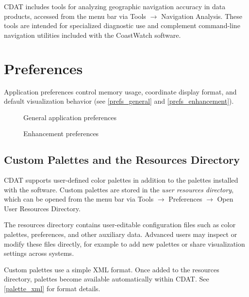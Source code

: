 CDAT includes tools for analyzing geographic navigation accuracy in
data products, accessed from the menu bar via {\gui Tools \(\rightarrow\) Navigation Analysis}. 
These tools are intended for specialized diagnostic use
and complement command-line navigation utilities included with the
CoastWatch software.

\section{Preferences}
\label{preferences}

Application preferences control memory usage, coordinate display format,
and default visualization behavior (see \autoref{prefs_general} and 
\autoref{prefs_enhancement}).

\begin{figure}
  \begin{center}
    \caption{General application preferences}
    \label{prefs_general}
  \end{center}
\end{figure}

\begin{figure}
  \begin{center}
    \caption{Enhancement preferences}
    \label{prefs_enhancement}
  \end{center}
\end{figure}

\subsection*{Custom Palettes and the Resources Directory}

CDAT supports user-defined color palettes in addition to the palettes
installed with the software. Custom palettes are stored in the
\emph{user resources directory}, which can be opened from the menu bar
via {\gui Tools \(\rightarrow\) Preferences \(\rightarrow\) Open User Resources Directory}.

The resources directory contains user-editable configuration files
such as color palettes, preferences, and other auxiliary data.
Advanced users may inspect or modify these files directly, for example
to add new palettes or share visualization settings across systems.

Custom palettes use a simple XML format. Once added to the resources
directory, palettes become available automatically within CDAT.  
See \autoref{palette_xml} for format details.

